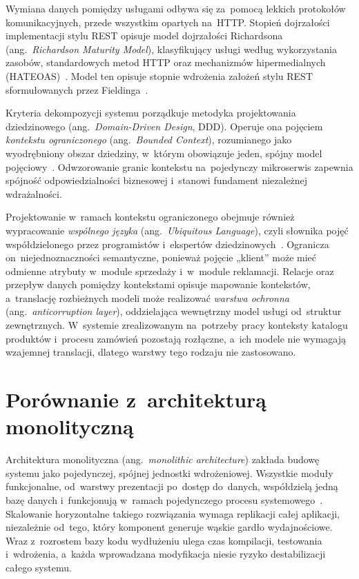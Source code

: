 Wymiana danych pomiędzy usługami odbywa się za~pomocą lekkich protokołów komunikacyjnych, przede wszystkim opartych na~HTTP. Stopień dojrzałości implementacji stylu REST opisuje model dojrzałości Richardsona (ang.\ \textit{Richardson Maturity Model}), klasyfikujący usługi według wykorzystania zasobów, standardowych metod HTTP oraz mechanizmów hipermedialnych (HATEOAS)~\cite{bib:RichardsonMaturity}. Model ten opisuje stopnie wdrożenia założeń stylu REST sformułowanych przez Fieldinga~\cite{bib:Fielding2000}.

Kryteria dekompozycji systemu porządkuje metodyka projektowania dziedzinowego (ang.\ \textit{Domain-Driven Design}, DDD). Operuje ona pojęciem \textit{kontekstu ograniczonego} (ang.\ \textit{Bounded Context}), rozumianego jako wyodrębniony obszar dziedziny, w~którym obowiązuje jeden, spójny model pojęciowy~\cite{bib:Evans2003}. Odwzorowanie granic kontekstu na~pojedynczy mikroserwis zapewnia spójność odpowiedzialności biznesowej i~stanowi fundament niezależnej wdrażalności.

Projektowanie w~ramach kontekstu ograniczonego obejmuje również wypracowanie \textit{wspólnego języka} (ang.\ \textit{Ubiquitous Language}), czyli słownika pojęć współdzielonego przez programistów i~ekspertów dziedzinowych~\cite{bib:Evans2003}. Ogranicza on~niejednoznaczności semantyczne, ponieważ pojęcie „klient” może mieć odmienne atrybuty w~module sprzedaży i~w~module reklamacji. Relacje oraz przepływ danych pomiędzy kontekstami opisuje mapowanie kontekstów, a~translację rozbieżnych modeli może realizować \textit{warstwa ochronna} (ang.\ \textit{anticorruption layer}), oddzielająca wewnętrzny model usługi od~struktur zewnętrznych. W~systemie zrealizowanym na~potrzeby pracy konteksty katalogu produktów i~procesu zamówień pozostają rozłączne, a~ich modele nie wymagają wzajemnej translacji, dlatego warstwy tego rodzaju nie zastosowano.

\section{Porównanie z~architekturą monolityczną}
\label{sec:PorownanieMikroserwisyMonolit}

Architektura monolityczna (ang.\ \textit{monolithic architecture}) zakłada budowę systemu jako pojedynczej, spójnej jednostki wdrożeniowej. Wszystkie moduły funkcjonalne, od~warstwy prezentacji po~dostęp do~danych, współdzielą jedną bazę danych i~funkcjonują w~ramach pojedynczego procesu systemowego~\cite{bib:Newman2021}. Skalowanie horyzontalne takiego rozwiązania wymaga replikacji całej aplikacji, niezależnie od~tego, który komponent generuje wąskie gardło wydajnościowe. Wraz z~rozrostem bazy kodu wydłużeniu ulega czas kompilacji, testowania i~wdrożenia, a~każda wprowadzana modyfikacja niesie ryzyko destabilizacji całego systemu.

